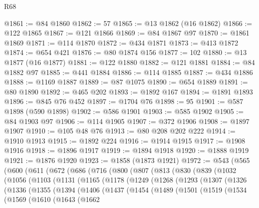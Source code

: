 \begin{lexlean}{R68}
\begin{coremodule}
@1861 := @84 @1860
@1862 := 57
@1865 := @13 @1862 (@16 @1862)
@1866 := @122 @1865
@1867 := @121 @1866
@1869 := @84 @1867 @97
@1870 := @1861 @1869
@1871 := @114 @1870
@1872 := @434 @1871
@1873 := @413 @1872
@1874 := @654 @421
@1876 := @80 @1874 @156
@1877 := 102
@1880 := @13 @1877 (@16 @1877)
@1881 := @122 @1880
@1882 := @121 @1881
@1884 := @84 @1882 @97
@1885 := @441 @1884
@1886 := @114 @1885
@1887 := @434 @1886
@1888 := @1169 @1887
@1889 := @87 @1075
@1890 := @654 @1889
@1891 := @80 @1890
@1892 := @465 @202
@1893 := @1892 @167
@1894 := @1891 @1893
@1896 := @845 @76 @452
@1897 := @1704 @76
@1898 := 95
@1901 := @587 @1898 (@590 @1898)
@1902 := @586 @1901
@1903 := @585 @1902
@1905 := @84 @1903 @97
@1906 := @114 @1905
@1907 := @372 @1906
@1908 := @1897 @1907
@1910 := @105 @48 @76
@1913 := @80 @208 @202 @222
@1914 := @1910 @1913
@1915 := @1892 @224
@1916 := @1914 @1915
@1917 := @1908 @1916
@1918 := @1896 @1917
@1919 := @1894 @1918
@1920 := @1888 @1919
@1921 := @1876 @1920
@1923 := @1858 (@1873 @1921)
@1972 := @543
    (@565
      (@600
        (@611
          (@672
            (@686
              (@716
                (@800
                  (@807
                    (@813
                      (@830
                        (@839
                          (@1032
                            (@1056
                              (@1103
                                (@1131
                                  (@1165
                                    (@1178
                                      (@1249
                                        (@1268
                                          (@1293
                                            (@1307
                                              (@1326
                                                (@1336
                                                  (@1355
                                                    (@1394
                                                      (@1406
                                                        (@1437
                                                          (@1454
                                                            (@1489
                                                              (@1501
                                                                (@1519
                                                                  (@1534
                                                                    (@1569
                                                                      (@1610
                                                                        (@1643
                                                                          (@1662

\end{coremodule}
\end{lexlean}
